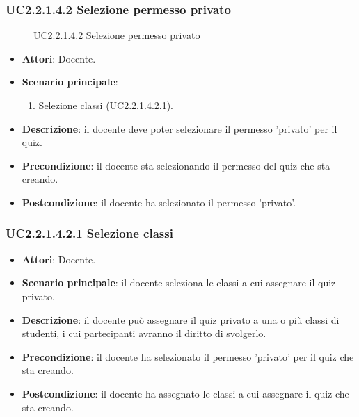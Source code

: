 \subsubsection{UC2.2.1.4.2 Selezione permesso privato}
\begin{figure}[H]
\centering
\noindent{}
\caption{UC2.2.1.4.2 Selezione permesso privato}
\end{figure}
\begin{itemize}
\item \textbf{Attori}: Docente.
\item \textbf{Scenario principale}:
\begin{enumerate}
\item Selezione classi (UC2.2.1.4.2.1).
\end{enumerate}
\item \textbf{Descrizione}: il docente deve poter selezionare il permesso 'privato' per il quiz.
\item \textbf{Precondizione}: il docente sta selezionando il permesso del quiz che sta creando.
\item \textbf{Postcondizione}: il docente ha selezionato il permesso 'privato'.
\end{itemize}
\subsubsection{UC2.2.1.4.2.1 Selezione classi}
\begin{itemize}
\item \textbf{Attori}: Docente.
\item \textbf{Scenario principale}: il docente seleziona le classi a cui assegnare il quiz privato.
\item \textbf{Descrizione}: il docente può assegnare il quiz privato a una o più classi di studenti, i cui partecipanti avranno il diritto di svolgerlo.
\item \textbf{Precondizione}: il docente ha selezionato il permesso 'privato' per il quiz che sta creando.
\item \textbf{Postcondizione}: il docente ha assegnato le classi a cui assegnare il quiz che sta creando.
\end{itemize}
